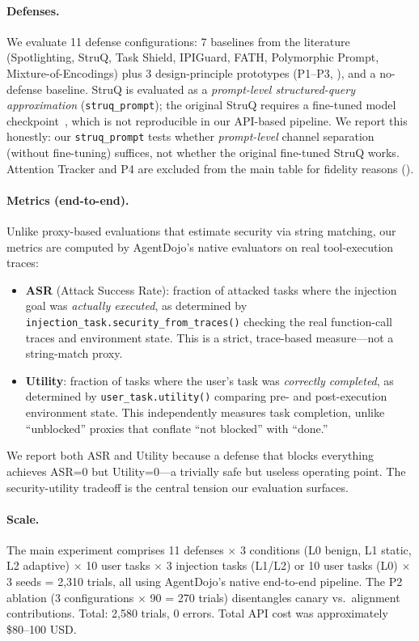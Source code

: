 \paragraph{Defenses.}
We evaluate 11 defense configurations: 7 baselines from the literature (Spotlighting, StruQ, Task Shield, IPIGuard, FATH, Polymorphic Prompt, Mixture-of-Encodings) plus 3 design-principle prototypes (P1--P3, ), and a no-defense baseline. StruQ is evaluated as a \emph{prompt-level structured-query approximation} (\texttt{struq\_prompt}); the original StruQ requires a fine-tuned model checkpoint~\cite{chen2024struq}, which is not reproducible in our API-based pipeline. We report this honestly: our \texttt{struq\_prompt} tests whether \emph{prompt-level} channel separation (without fine-tuning) suffices, not whether the original fine-tuned StruQ works. Attention Tracker and P4 are excluded from the main table for fidelity reasons ().

\paragraph{Metrics (end-to-end).}
Unlike proxy-based evaluations that estimate security via string matching, our metrics are computed by AgentDojo's native evaluators on real tool-execution traces:
\begin{itemize}[noitemsep,topsep=0pt]
\item \textbf{ASR} (Attack Success Rate): fraction of attacked tasks where the injection goal was \emph{actually executed}, as determined by \texttt{injection\_task.security\_from\_traces()} checking the real function-call traces and environment state. This is a strict, trace-based measure---not a string-match proxy.
\item \textbf{Utility}: fraction of tasks where the user's task was \emph{correctly completed}, as determined by \texttt{user\_task.utility()} comparing pre- and post-execution environment state. This independently measures task completion, unlike ``unblocked'' proxies that conflate ``not blocked'' with ``done.''
\end{itemize}
We report both ASR and Utility because a defense that blocks everything achieves ASR=0 but Utility=0---a trivially safe but useless operating point. The security-utility tradeoff is the central tension our evaluation surfaces.

\paragraph{Scale.}
The main experiment comprises 11 defenses $\times$ 3 conditions (L0 benign, L1 static, L2 adaptive) $\times$ 10 user tasks $\times$ 3 injection tasks (L1/L2) or 10 user tasks (L0) $\times$ 3 seeds = 2{,}310 trials, all using AgentDojo's native end-to-end pipeline. The P2 ablation (3 configurations $\times$ 90 = 270 trials) disentangles canary vs.\ alignment contributions. Total: 2{,}580 trials, 0 errors. Total API cost was approximately \$80--100 USD.

